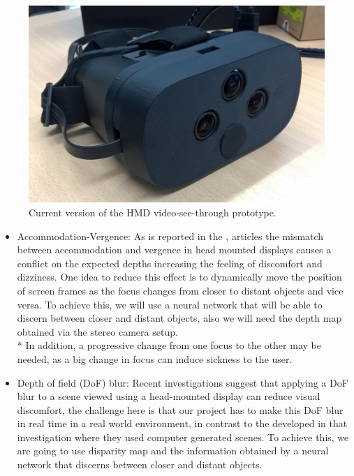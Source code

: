 \documentclass[10pt,a4paper,twocolumn,twoside]{article}
\begin{document}
	\begin{figure}
		\centering
		\includegraphics[width=1\linewidth]{img/imagenproto3.jpg}
		\caption{Current version of the HMD video-see-through prototype.}
		\label{fig:proto}
	\end{figure}
	
	\begin{itemize}
		\item Accommodation-Vergence: As is reported in the \cite{disconfortReview}, \cite{vergenceDisconfort} articles the mismatch between accommodation and vergence in head mounted displays causes a conflict on the expected depths increasing the feeling of discomfort and dizziness.  One idea to reduce this effect is to dynamically move the position of screen frames as the focus changes from closer to distant objects and vice versa. To achieve this, we will use a neural network that will be able to discern between closer and distant objects, also we will need the depth map obtained via the stereo camera setup. \\*
		In addition, a progressive change from one focus to the other may be needed, as a big change in focus can induce sickness to the user.
		
		\item Depth of field (DoF) blur: Recent investigations \cite{ifftConfortDoF} suggest that applying a DoF blur to a scene viewed using a head-mounted display can reduce visual discomfort, the challenge here is that our project has to make this DoF blur in real time in a real world environment, in contrast to the developed in that investigation where they used computer generated scenes. To achieve this, we are going to use disparity map and the information obtained by a neural network that discerns between closer and distant objects.
	\end{itemize} 
	
\end{document}

